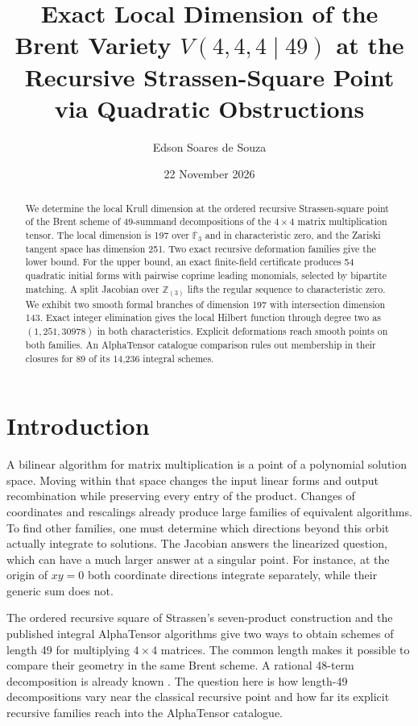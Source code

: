 \documentclass[11pt]{amsart}
\title[Local dimension at the Strassen square]{Exact Local Dimension of the Brent Variety
\texorpdfstring{$V(4,4,4\mid49)$}{V(4,4,4 | 49)} at the Recursive
Strassen-Square Point via Quadratic Obstructions}
\author{Edson Soares de Souza}
\date{22 November 2026}
\newcommand{\F}{\mathbb F}
\newcommand{\Z}{\mathbb Z}
\begin{document}
\begin{abstract}
We determine the local Krull dimension at the ordered recursive
Strassen-square point of the Brent scheme of 49-summand decompositions
of the $4\times4$ matrix multiplication tensor. The local dimension is
197 over $\overline{\F}_3$ and in characteristic zero, and the Zariski
tangent space has dimension 251. Two exact recursive deformation
families give the lower bound. For the upper bound, an exact
finite-field certificate produces 54 quadratic initial forms with
pairwise coprime leading monomials, selected by bipartite matching.
A split Jacobian over $\Z_{(3)}$ lifts the regular sequence to
characteristic zero. We exhibit two smooth formal branches of
dimension 197 with intersection dimension 143. Exact integer
elimination gives the local Hilbert function through degree two
as $(1,251,30978)$ in both characteristics. Explicit deformations
reach smooth points on both families. An AlphaTensor catalogue comparison rules out
membership in their closures for 89 of its 14,236 integral schemes.
\end{abstract}
\maketitle

\section{Introduction}

A bilinear algorithm for matrix multiplication is a point of a
polynomial solution space. Moving within that space changes the
input linear forms and output recombination while preserving every
entry of the product. Changes of coordinates and rescalings already
produce large families of equivalent algorithms. To find other
families, one must determine which directions beyond this orbit
actually integrate to solutions. The Jacobian answers the linearized
question, which can have a much larger answer at a singular point.
For instance, at the origin of $xy=0$ both coordinate directions
integrate separately, while their generic sum does not.

The ordered recursive square of Strassen's seven-product construction
and the published integral AlphaTensor algorithms give two ways to
obtain schemes of length 49 for multiplying $4\times4$ matrices.
The common length makes it possible to compare their geometry in
the same Brent scheme. A rational 48-term decomposition is already
known \cite{dps}. The question here is how length-49 decompositions
vary near the classical recursive point and how far its explicit
recursive families reach into the AlphaTensor catalogue.
\end{document}
